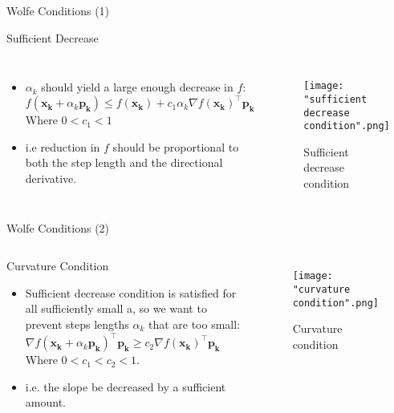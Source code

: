 \documentclass{beamer}
\begin{document}
    \begin{frame}{Wolfe Conditions (1)}
        \begin{block}{Sufficient Decrease}
            \begin{columns}
            \begin{itemize}
            \item $\alpha_k$ should yield a large enough decrease in $f$:
            $$f(\mathbf{x_k} + \alpha_k\mathbf{p_k}) \leq f(\mathbf{x_k}) + c_1 \alpha_k \nabla f(\mathbf{x_k})^\top \mathbf{p_k}$$
            Where $0< c_1 < 1$ \\
            \item i.e reduction in $f$ should be proportional to both the step length and the directional derivative.
            \end{itemize}
            
            \begin{figure}
                \centering
                \texttt{[image: "sufficient decrease condition".png]}
                \caption{Sufficient decrease condition}
            \end{figure}
        
            \end{columns}
        \end{block}

    \end{frame}

    \begin{frame}{Wolfe Conditions (2)}
        \begin{columns}

        \begin{block}{Curvature Condition}
        \begin{itemize}
            \item Sufficient decrease condition is satisfied for all sufficiently small a, so we want to prevent steps lengths $\alpha_k$ that are too small:
            $ \nabla f(\mathbf{x_k} + \alpha_k \mathbf{p_k})^\top \mathbf{p_k} \geq c_2 \nabla f(\mathbf{x_k})^\top \mathbf{p_k}$
            Where $0 < c_1 < c_2 < 1$. \\
            \item i.e. the slope be decreased by a sufficient amount.   
        \end{itemize}
        \end{block}

        \begin{figure}
            \centering
            \texttt{[image: "curvature condition".png]}
            \caption{Curvature condition}
        \end{figure}

        \end{columns}
    \end{frame}
\end{document}
